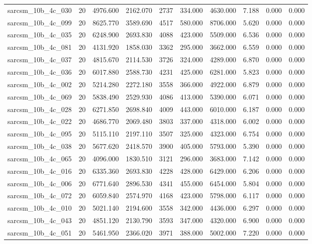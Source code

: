\begin{tabular}{lrrrrrrrrr}
sarcsm\_10b\_4c\_030 & 20 & 4976.600 & 2162.070 & 2737 & 334.000 & 4630.000 & 7.188 & 0.000 & 0.000 \\
sarcsm\_10b\_4c\_099 & 20 & 8625.770 & 3589.690 & 4517 & 580.000 & 8706.000 & 5.620 & 0.000 & 0.000 \\
sarcsm\_10b\_4c\_035 & 20 & 6248.900 & 2693.830 & 4088 & 423.000 & 5509.000 & 6.536 & 0.000 & 0.000 \\
sarcsm\_10b\_4c\_081 & 20 & 4131.920 & 1858.030 & 3362 & 295.000 & 3662.000 & 6.559 & 0.000 & 0.000 \\
sarcsm\_10b\_4c\_037 & 20 & 4815.670 & 2114.530 & 3726 & 324.000 & 4289.000 & 6.870 & 0.000 & 0.000 \\
sarcsm\_10b\_4c\_036 & 20 & 6017.880 & 2588.730 & 4231 & 425.000 & 6281.000 & 5.823 & 0.000 & 0.000 \\
sarcsm\_10b\_4c\_002 & 20 & 5214.280 & 2272.180 & 3558 & 366.000 & 4922.000 & 6.879 & 0.000 & 0.000 \\
sarcsm\_10b\_4c\_069 & 20 & 5838.490 & 2529.930 & 4086 & 413.000 & 5390.000 & 6.071 & 0.000 & 0.000 \\
sarcsm\_10b\_4c\_028 & 20 & 6271.850 & 2698.840 & 4009 & 443.000 & 6010.000 & 6.187 & 0.000 & 0.000 \\
sarcsm\_10b\_4c\_022 & 20 & 4686.770 & 2069.480 & 3803 & 337.000 & 4318.000 & 6.002 & 0.000 & 0.000 \\
sarcsm\_10b\_4c\_095 & 20 & 5115.110 & 2197.110 & 3507 & 325.000 & 4323.000 & 6.754 & 0.000 & 0.000 \\
sarcsm\_10b\_4c\_038 & 20 & 5677.620 & 2418.570 & 3900 & 405.000 & 5793.000 & 5.390 & 0.000 & 0.000 \\
sarcsm\_10b\_4c\_065 & 20 & 4096.000 & 1830.510 & 3121 & 296.000 & 3683.000 & 7.142 & 0.000 & 0.000 \\
sarcsm\_10b\_4c\_016 & 20 & 6335.360 & 2693.830 & 4228 & 428.000 & 6429.000 & 6.206 & 0.000 & 0.000 \\
sarcsm\_10b\_4c\_006 & 20 & 6771.640 & 2896.530 & 4341 & 455.000 & 6454.000 & 5.804 & 0.000 & 0.000 \\
sarcsm\_10b\_4c\_072 & 20 & 6059.840 & 2574.970 & 4168 & 423.000 & 5798.000 & 6.117 & 0.000 & 0.000 \\
sarcsm\_10b\_4c\_010 & 20 & 5021.140 & 2194.600 & 3558 & 342.000 & 4436.000 & 6.297 & 0.000 & 0.000 \\
sarcsm\_10b\_4c\_043 & 20 & 4851.120 & 2130.790 & 3593 & 347.000 & 4320.000 & 6.900 & 0.000 & 0.000 \\
sarcsm\_10b\_4c\_051 & 20 & 5461.950 & 2366.020 & 3971 & 388.000 & 5002.000 & 7.220 & 0.000 & 0.000 \\

\end{tabular}
